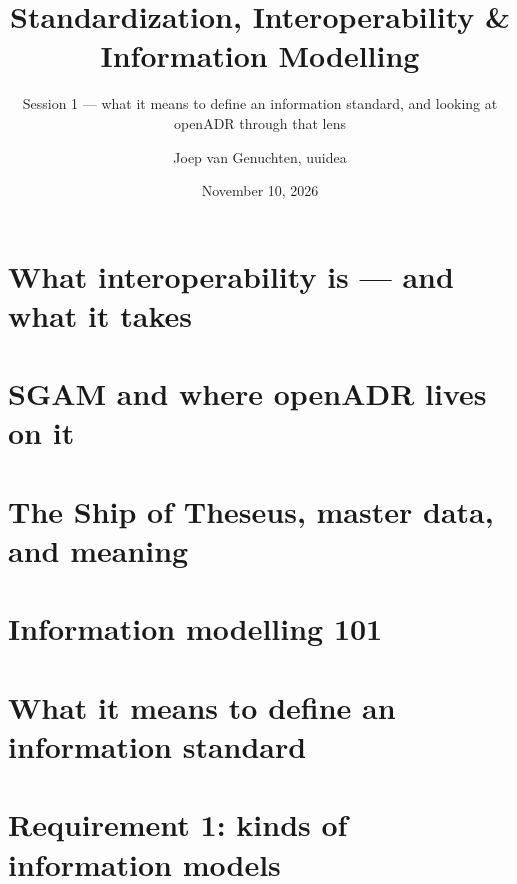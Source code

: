 \documentclass[aspectratio=169]{beamer}
\title{Standardization, Interoperability \& Information Modelling}
\subtitle{Session 1 — what it means to define an information standard, and looking at openADR through that lens}
\author{Joep van Genuchten, uuidea}
\date{November 10, 2026}
\begin{document}
\frame{\titlepage}

% 



\section{What interoperability is — and what it takes}









\section{SGAM and where openADR lives on it}



% 
% 

\section{The Ship of Theseus, master data, and meaning}



\section{Information modelling 101}







\section{What it means to define an information standard}




\section{Requirement 1: kinds of information models}






\end{document}
